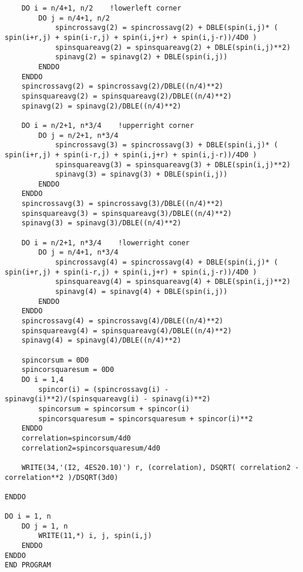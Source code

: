 \documentclass{article}
\begin{document}
\begin{verbatim}
	DO i = n/4+1, n/2    !lowerleft corner
		DO j = n/4+1, n/2
			spincrossavg(2) = spincrossavg(2) + DBLE(spin(i,j)* ( spin(i+r,j) + spin(i-r,j) + spin(i,j+r) + spin(i,j-r))/4D0 )
			spinsquareavg(2) = spinsquareavg(2) + DBLE(spin(i,j)**2)
			spinavg(2) = spinavg(2) + DBLE(spin(i,j))	
		ENDDO 
	ENDDO 
	spincrossavg(2) = spincrossavg(2)/DBLE((n/4)**2)
	spinsquareavg(2) = spinsquareavg(2)/DBLE((n/4)**2)
	spinavg(2) = spinavg(2)/DBLE((n/4)**2)

	DO i = n/2+1, n*3/4    !upperright corner
		DO j = n/2+1, n*3/4
			spincrossavg(3) = spincrossavg(3) + DBLE(spin(i,j)* ( spin(i+r,j) + spin(i-r,j) + spin(i,j+r) + spin(i,j-r))/4D0 )
			spinsquareavg(3) = spinsquareavg(3) + DBLE(spin(i,j)**2)
			spinavg(3) = spinavg(3) + DBLE(spin(i,j))	
		ENDDO 
	ENDDO 
	spincrossavg(3) = spincrossavg(3)/DBLE((n/4)**2)
	spinsquareavg(3) = spinsquareavg(3)/DBLE((n/4)**2)
	spinavg(3) = spinavg(3)/DBLE((n/4)**2)

	DO i = n/2+1, n*3/4    !lowerright coner
		DO j = n/4+1, n*3/4
			spincrossavg(4) = spincrossavg(4) + DBLE(spin(i,j)* ( spin(i+r,j) + spin(i-r,j) + spin(i,j+r) + spin(i,j-r))/4D0 )
			spinsquareavg(4) = spinsquareavg(4) + DBLE(spin(i,j)**2)
			spinavg(4) = spinavg(4) + DBLE(spin(i,j))	
		ENDDO 
	ENDDO 
	spincrossavg(4) = spincrossavg(4)/DBLE((n/4)**2)
	spinsquareavg(4) = spinsquareavg(4)/DBLE((n/4)**2)
	spinavg(4) = spinavg(4)/DBLE((n/4)**2)

	spincorsum = 0D0
	spincorsquaresum = 0D0
    DO i = 1,4
		spincor(i) = (spincrossavg(i) - spinavg(i)**2)/(spinsquareavg(i) - spinavg(i)**2)
		spincorsum = spincorsum + spincor(i)
		spincorsquaresum = spincorsquaresum + spincor(i)**2
	ENDDO 
    correlation=spincorsum/4d0
	correlation2=spincorsquaresum/4d0

	WRITE(34,'(I2, 4ES20.10)') r, (correlation), DSQRT( correlation2 - correlation**2 )/DSQRT(3d0)

ENDDO 

DO i = 1, n
	DO j = 1, n
		WRITE(11,*) i, j, spin(i,j)
	ENDDO 
ENDDO 
END PROGRAM

\end{verbatim}
\end{document}
